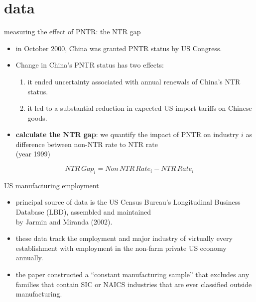 \documentclass[10pt]{beamer}
\begin{document}
\section{data}

\begin{frame}[fragile]{measuring the effect of PNTR: the NTR gap}
	\begin{itemize}
		\item in October 2000, China was granted PNTR status by US Congress.
		\item Change in China's PNTR status has two effects:
			\begin{enumerate}
				\item it ended uncertainty associated with annual renewals of China's NTR status. \hyperlink{uncertainty}{}
				\item it led to a substantial reduction in expected US import tariffs on Chinese goods.
			\end{enumerate}
	\end{itemize}
	
	\begin{itemize}
		\item \textbf{calculate the NTR gap}: we quantify the impact of PNTR on industry $i$ as difference between non-NTR rate to NTR rate\\ (year 1999) \hyperlink{distribution}{}
	\end{itemize}
	$$NTR\,Gap_i=Non\,NTR\,Rate_i-NTR\,Rate_i$$
\end{frame}

\begin{frame}{US manufacturing employment}
	\begin{itemize}
		\item principal source of data is the US Census Bureau’s Longitudinal Business Database (LBD), assembled and maintained\\ by Jarmin and Miranda (2002). 
		\item these data track the employment and major industry of virtually every establishment \hyperlink{establishment}{} with employment in the non-farm private US economy annually.
		\item the paper constructed a “constant manufacturing sample” that excludes any families that contain SIC or NAICS industries that are ever classified outside manufacturing. 
	\end{itemize}
\end{frame}
\end{document}
